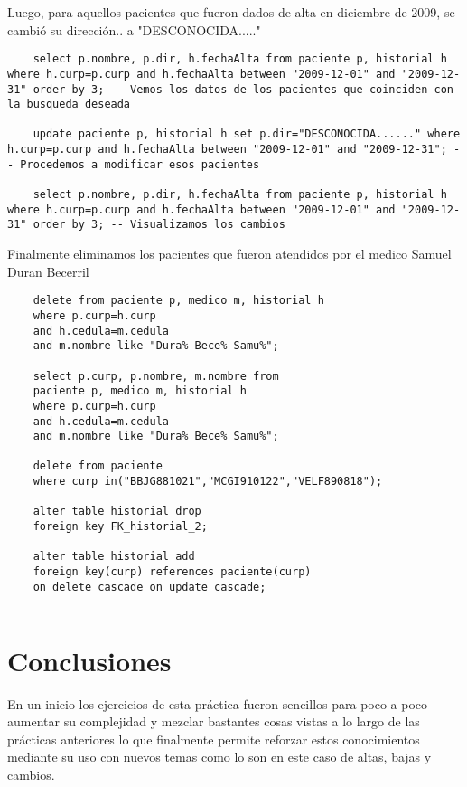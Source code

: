 \documentclass[12pt, titlepage]{article}
\begin{document}
	Luego, para aquellos pacientes que fueron dados de alta en diciembre de 2009, se cambió su dirección.. a "DESCONOCIDA....."
	\begin{lstlisting}
	select p.nombre, p.dir, h.fechaAlta	from paciente p, historial h where h.curp=p.curp and h.fechaAlta between "2009-12-01" and "2009-12-31" order by 3; -- Vemos los datos de los pacientes que coinciden con la busqueda deseada
	
	update paciente p, historial h set p.dir="DESCONOCIDA......" where h.curp=p.curp and h.fechaAlta between "2009-12-01" and "2009-12-31"; -- Procedemos a modificar esos pacientes
	
	select p.nombre, p.dir, h.fechaAlta	from paciente p, historial h where h.curp=p.curp and h.fechaAlta between "2009-12-01" and "2009-12-31" order by 3; -- Visualizamos los cambios
	\end{lstlisting}
	Finalmente eliminamos los pacientes que fueron atendidos por el medico Samuel Duran Becerril
	\begin{lstlisting}
	delete from paciente p, medico m, historial h
	where p.curp=h.curp
	and h.cedula=m.cedula
	and m.nombre like "Dura% Bece% Samu%";
	
	select p.curp, p.nombre, m.nombre from
	paciente p, medico m, historial h
	where p.curp=h.curp
	and h.cedula=m.cedula
	and m.nombre like "Dura% Bece% Samu%";
	
	delete from paciente
	where curp in("BBJG881021","MCGI910122","VELF890818");
	
	alter table historial drop
	foreign key FK_historial_2;
	
	alter table historial add
	foreign key(curp) references paciente(curp)
	on delete cascade on update cascade;
	\end{lstlisting}
	
	\begin{lstlisting}
	\end{lstlisting}
	\section{Conclusiones}
	En un inicio los ejercicios de esta práctica fueron sencillos para poco a poco aumentar su complejidad y mezclar bastantes cosas vistas a lo largo de las prácticas anteriores lo que finalmente permite reforzar estos conocimientos mediante su uso con nuevos temas como lo son en este caso de altas, bajas y cambios.
	 
	
\end{document}

